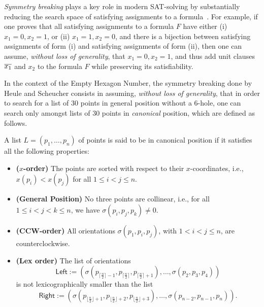 \emph{Symmetry breaking} plays a key role in modern SAT-solving by substantially reducing the search space of satisfying assignments to a formula~\cite{biereHandbookSatisfiabilityVolume2009}. For example, if one proves that all satisfying assignments to a formula $F$ have either (i) $x_1 = 0, x_2 = 1$, or  (ii) $x_1 = 1, x_2 = 0$, and there is a bijection between satisfying assignments of form (i) and satisfying assignments of form (ii), then one can assume, \emph{without loss of generality}, that $x_1 = 0, x_2 = 1$, and thus add unit clauses $\overline{x_1}$ and $x_2$ to the formula $F$ while preserving its satisfiability.

In the context of the Empty Hexagon Number, the symmetry breaking done by Heule and Scheucher consists in assuming, \emph{without loss of generality}, that in order to search for a list of $30$ points in general position without a $6$-hole, one can search only amongst lists of $30$ points in \emph{canonical} position, which are defined as follows.
\begin{definition}
A list $L = (p_1,\ldots, p_{n})$ of points is said to be in canonical position if it satisfies all the following properties:
\begin{itemize}
    \item \textbf{($x$-order)} The points are sorted with respect to their $x$-coordinates, i.e., $x(p_i) < x(p_j)$ for all $1 \leq i < j \leq n$.
    \item \textbf{(General Position)} No three points are collinear, i.e., for all $1 \leq i < j < k \leq n$, we have $\sigma(p_i, p_j, p_k) \neq 0$.
    \item \textbf{(CCW-order)} All orientations $\sigma(p_1, p_i, p_j)$, with $1 < i < j \leq n$, are counterclockwise.
    \item \textbf{(Lex order)} The list of orientations \[\textsf{Left} := \left(\sigma\left(p_{\lceil \frac{n}{2} \rceil -1}, p_{\lceil \frac{n}{2} \rceil},p_{\lceil \frac{n}{2} \rceil+1}\right), \ldots, \sigma\left(p_2, p_3, p_4\right) \right)\] is not lexicographically smaller than the list \[ \textsf{Right} := \left(\sigma\left(p_{\lfloor \frac{n}{2} \rfloor  + 1}, p_{\lfloor \frac{n}{2} \rfloor+2},p_{\lfloor \frac{n}{2} \rfloor+3}\right), \ldots, \sigma\left(p_{n-2}, p_{n-1}, p_{n}\right) \right).\]
\end{itemize}
\end{definition}
